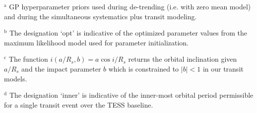 \begin{table*}
\begin{list}{}{}
  \item $^{\text{a}}$ GP hyperparameter priors used during de-trending (i.e. with zero mean model) and during the simultaneous systematics plus transit modeling.
  \item $^{\text{b}}$ The designation `opt' is indicative of the optimized parameter values from the maximum likelihood model used for parameter initialization.
  \item $^{\text{c}}$ The function $i(a/R_s,b)=a \cos{i}/R_s$ returns the orbital inclination
    given $a/R_s$ and the impact parameter $b$ which is constrained to $|b|<1$ in our transit models.
  \item $^{\text{d}}$ The designation `inner' is indicative of the inner-most orbital period 
  permissible for a single transit event over the TESS baseline.
  \end{list}
\end{table*}
